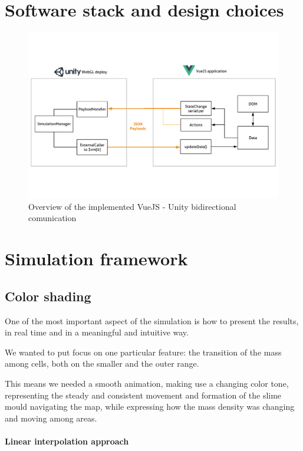 \section{Software stack and design choices}

\begin{figure}
  \centering
    \includegraphics[width=1\textwidth]{sw_arch}%
    
  \caption{Overview of the implemented VueJS - Unity bidirectional comunication}
  \label{fig:swstack1}
\end{figure}


\section{Simulation framework}


\subsection{Color shading}

One of the most important aspect of the simulation is how to present the results, in real time and in a meaningful and intuitive way. 

We wanted to put focus on one particular feature: the transition of the mass among cells, both on the smaller and the outer range.

This means we needed a smooth animation, making use a changing color tone, representing the steady and consistent movement and formation of the slime mould navigating the map, while expressing how the mass density was changing and moving among areas.

\paragraph{Linear interpolation approach}

